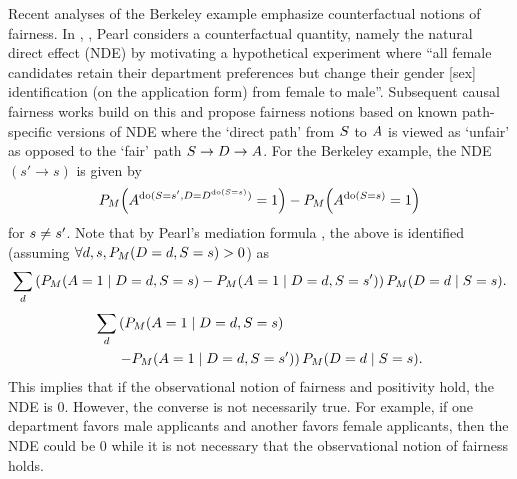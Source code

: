 Recent analyses of the Berkeley example emphasize counterfactual notions of fairness. In \citet[Section 4.5.4]{Pearl09}, \citet{PearlMackenzie18}, Pearl considers a counterfactual quantity, namely the natural direct effect (NDE) \citep{RobinsG92, Pearl01}  by motivating a hypothetical experiment where ``all female candidates retain their department preferences but change their gender [sex] identification (on the application form) from female to male''. Subsequent causal fairness works \citep{NabiShpitser18, Chiappa19} build on this and propose fairness notions based on known path-specific versions of NDE where the `direct path' from $S$ to $A$ is viewed as `unfair' as opposed to the `fair' path $S \rightarrow D \rightarrow A$. For the Berkeley example, the NDE$(s' \rightarrow s)$ is given by 
\begin{equation*}
P_{M}{\left({A^{\text{do}(S = s', D = D^{\text{do}(S=s)})}=1}\right)} - P_{M}{\left({A^{\text{do}(S=s)}=1}\right)}
\end{equation*}
for $s \neq s'$. Note that by Pearl's mediation formula \citep{Pearl01}, the above is identified (assuming $\forall d, s, P_{M}{\left({D = d, S = s}\right)} > 0$) as 
\ifdefined\SINGLE
\begin{equation*}
    \sum\limits_{d} \left( P_{M}{\left({A=1 \mid D = d, S = s}\right)}  - P_{M}{\left({A=1 \mid D = d, S = s'}\right)}\right)P_{M}{\left({D = d \mid S= s}\right)}.
\end{equation*}
\else
\begin{align*}
    \sum\limits_{d} & \left( P_{M}{\left({A=1 \mid D = d, S = s}\right)} \right. \\
    &\left. - P_{M}{\left({A=1 \mid D = d, S = s'}\right)}\right)P_{M}{\left({D = d \mid S= s}\right)}.
\end{align*}
\fi
This implies that if the observational notion of fairness and positivity hold, the NDE is $0$. However, the converse is not necessarily true. For example, if one department favors male applicants and another favors female applicants, then the NDE could be $0$ while it is not necessary that the observational notion of fairness holds. 

